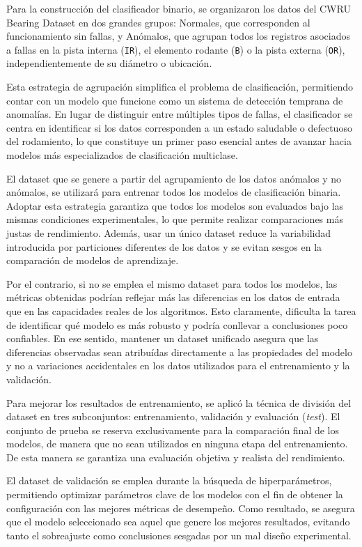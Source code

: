\documentclass[11pt,a4paper,spanish]{book}
\numberwithin{equation}{chapter}
\numberwithin{figure}{chapter}
\begin{document}
Para la construcción del clasificador binario, se organizaron los datos del CWRU Bearing 
Dataset en dos grandes grupos: Normales, que corresponden al funcionamiento sin fallas, 
y Anómalos,  que agrupan todos los registros asociados a fallas en la pista interna 
(\texttt{IR}), el elemento rodante (\texttt{B}) o la pista externa (\texttt{OR}), 
independientemente de su diámetro o ubicación.


Esta estrategia de agrupación simplifica el problema de clasificación, permitiendo 
contar con un modelo que funcione como un sistema de detección temprana de anomalías. 
En lugar de distinguir entre múltiples tipos de fallas, el clasificador se centra en 
identificar si los datos corresponden a un estado saludable o defectuoso del rodamiento,
lo que constituye un primer paso esencial antes de avanzar hacia modelos más 
especializados de clasificación multiclase.


El dataset que se genere a partir del agrupamiento de los datos anómalos y no anómalos, 
se utilizará para entrenar todos los modelos de clasificación binaria. 
Adoptar esta estrategia garantiza que todos los modelos son evaluados bajo las mismas 
condiciones experimentales, lo que permite realizar comparaciones más justas de rendimiento. 
Además, usar un único dataset reduce la variabilidad introducida por particiones 
diferentes de los datos y se evitan sesgos en la comparación de modelos de aprendizaje.


Por el contrario, si no se emplea el mismo dataset para todos los modelos, las métricas 
obtenidas podrían reflejar más las diferencias en los datos de entrada que en las 
capacidades reales de los algoritmos. Esto claramente, dificulta la tarea de identificar 
qué modelo es más robusto y podría conllevar a conclusiones poco confiables. 
En ese sentido, mantener un dataset unificado asegura que las diferencias observadas 
sean atribuídas directamente a las propiedades del modelo y no a variaciones 
accidentales en los datos utilizados para el entrenamiento y la validación.


Para mejorar los resultados de entrenamiento, se aplicó la técnica de división del 
dataset en tres subconjuntos: entrenamiento, validación y evaluación (\textit{test}). 
El conjunto de prueba se reserva exclusivamente para la comparación final de los modelos,
de manera que no sean utilizados en ninguna etapa del entrenamiento. 
De esta manera se garantiza una evaluación objetiva y realista del rendimiento. 


El dataset de validación se emplea durante la búsqueda de 
hiperparámetros, permitiendo optimizar parámetros clave de los modelos con el fin de 
obtener la configuración con las mejores métricas de desempeño. Como resultado, se 
asegura que el modelo seleccionado sea aquel que genere los mejores resultados, evitando
tanto el sobreajuste como conclusiones sesgadas por un mal diseño experimental.
\end{document}
